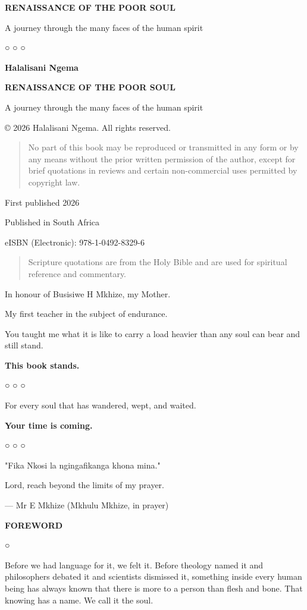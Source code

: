 \textbf{RENAISSANCE OF THE POOR SOUL}

A journey through the many faces of the human spirit

○ ○ ○

\textbf{Halalisani Ngema}

\textbf{RENAISSANCE OF THE POOR SOUL}

A journey through the many faces of the human spirit

© 2026 Halalisani Ngema. All rights reserved.

\begin{quote}
No part of this book may be reproduced or transmitted in any form or by
any means without the prior written permission of the author, except for
brief quotations in reviews and certain non-commercial uses permitted by
copyright law.
\end{quote}

First published 2026

Published in South Africa

eISBN (Electronic): 978-1-0492-8329-6

\begin{quote}
Scripture quotations are from the Holy Bible and are used for spiritual
reference and commentary.
\end{quote}

In honour of Busisiwe H Mkhize, my Mother.

My first teacher in the subject of endurance.

You taught me what it is like to carry a load heavier than any soul can
bear and still stand.

\textbf{This book stands.}

○ ○ ○

For every soul that has wandered, wept, and waited.

\textbf{Your time is coming.}

○ ○ ○

"Fika Nkosi la ngingafikanga khona mina."

Lord, reach beyond the limits of my prayer.

--- Mr E Mkhize (Mkhulu Mkhize, in prayer)

\textbf{FOREWORD}

○

Before we had language for it, we felt it. Before theology named it and
philosophers debated it and scientists dismissed it, something inside
every human being has always known that there is more to a person than
flesh and bone. That knowing has a name. We call it the soul.

